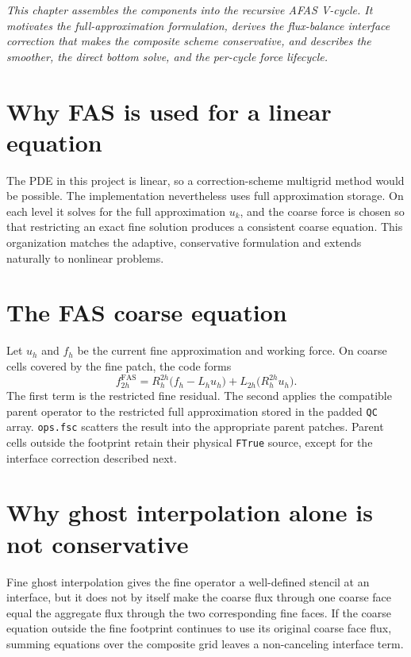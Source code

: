 \documentclass[11pt,oneside,openany]{book}
\newcommand{\code}[1]{\textnormal{\texttt{#1}}}
\begin{document}
\emph{This chapter assembles the components into the recursive AFAS V-cycle. It motivates the full-approximation formulation, derives the flux-balance interface correction that makes the composite scheme conservative, and describes the smoother, the direct bottom solve, and the per-cycle force lifecycle.}

\section{Why FAS is used for a linear equation}
The PDE in this project is linear, so a correction-scheme multigrid method would be possible. The implementation nevertheless uses full approximation storage. On each level it solves for the full approximation $u_k$, and the coarse force is chosen so that restricting an exact fine solution produces a consistent coarse equation. This organization matches the adaptive, conservative formulation and extends naturally to nonlinear problems.

\section{The FAS coarse equation}
Let $u_h$ and $f_h$ be the current fine approximation and working force. On coarse cells covered by the fine patch, the code forms
\begin{equation}
  f_{2h}^{\mathrm{FAS}}
  =R_h^{2h}\bigl(f_h-L_hu_h\bigr)
   +L_{2h}\bigl(R_h^{2h}u_h\bigr).
  \label{eq:fasload}
\end{equation}
The first term is the restricted fine residual. The second applies the compatible parent operator to the restricted full approximation stored in the padded \code{QC} array. \code{ops.fsc} scatters the result into the appropriate parent patches. Parent cells outside the footprint retain their physical \code{FTrue} source, except for the interface correction described next.

\section{Why ghost interpolation alone is not conservative}
Fine ghost interpolation gives the fine operator a well-defined stencil at an interface, but it does not by itself make the coarse flux through one coarse face equal the aggregate flux through the two corresponding fine faces. If the coarse equation outside the fine footprint continues to use its original coarse face flux, summing equations over the composite grid leaves a non-canceling interface term.
\end{document}
